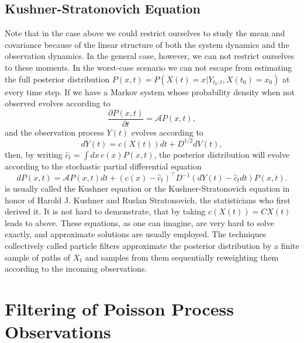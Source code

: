 \subsection{Kushner-Stratonovich Equation}

Note that in the case above we could restrict ourselves to study the mean and covariance because of the linear structure of both the system dynamics and the observation dynamics. In the general case, however, we can not restrict ourselves to these moments. In the worst-case scenario we can not escape from estimating the full posterior distribution $P(x,t) = P(X(t) = x|Y_{t_0:t},X(t_0) = x_0)$  at every time step. If we have a Markov system whose probability density when not observed evolves according to
\begin{equation}
\label{eq:kolmogorov_fw}
\frac{\partial P(x,t)}{\partial t} = \mathcal{A} P(x,t),
\end{equation}
and the observation process $Y(t)$ evolves according to
\[
dY(t) = c(X(t)) dt + D^{1/2} dV(t),
\]
then, by writing $\hat{c}_t = \int dx\, c(x) P(x,t)$, the posterior distribution will evolve according to the stochastic partial differential equation
\begin{equation}
\label{eq:kushner}
dP(x,t) = \mathcal{A} P(x,t) dt + (c(x) - \hat{c}_t)^\top D^{-1} (dY(t) - \hat{c}_t dt) P(x,t).
\end{equation}
 is usually called the Kushner equation or the Kushner-Stratonovich equation in honor of Harold J. Kushner and Ruslan Stratonovich, the statisticians 
who first derived it. It is not hard to demonstrate, that by taking $c(X(t)) = C X(t)$ leads to  above.\cite{Bucy1965} These equations, as one can 
imagine, are very hard to solve exactly, and approximate solutions are usually employed. The techniques collectively called particle filters approximate the posterior 
distribution by a finite sample of paths of $X_t$ and samples from them sequentially reweighting them according to the incoming observations.
 
\section{Filtering of Poisson Process Observations}
 
